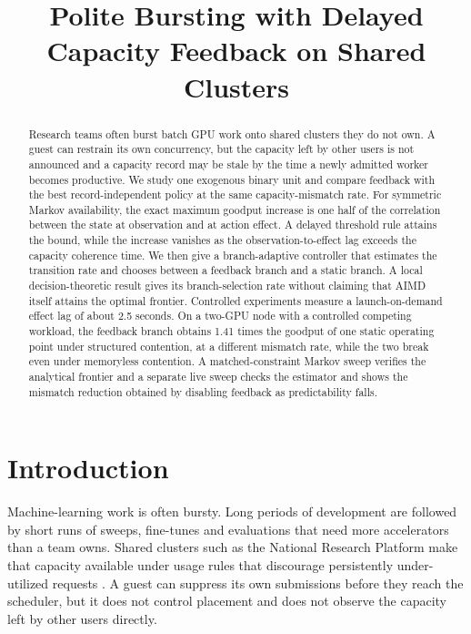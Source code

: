 \documentclass[10pt,conference,letterpaper]{IEEEtran}
\newif\ifblind
\begin{document}
\title{Polite Bursting with Delayed Capacity Feedback on Shared Clusters}

\ifblind
\author{}
\else
\author{
}
\fi

\maketitle

\begin{abstract}
Research teams often burst batch GPU work onto shared clusters they do not own.
A guest can restrain its own concurrency, but the capacity left by other users is
not announced and a capacity record may be stale by the time a newly admitted
worker becomes productive. We study one exogenous binary unit and compare
feedback with the best record-independent policy at the same capacity-mismatch
rate. For symmetric Markov availability, the exact maximum goodput increase is
one half of the correlation between the state at observation and at action
effect. A delayed threshold rule attains the bound, while the increase vanishes
as the observation-to-effect lag exceeds the capacity coherence time. We then
give a branch-adaptive controller that estimates the transition rate and chooses
between a feedback branch and a static branch. A local decision-theoretic result
gives its branch-selection rate without claiming that AIMD itself attains the
optimal frontier. Controlled experiments measure a launch-on-demand effect lag
of about 2.5 seconds. On a two-GPU node with a controlled competing workload,
the feedback branch obtains 1.41 times the goodput of one static operating point
under structured contention, at a different mismatch rate, while the two break
even under memoryless contention. A matched-constraint Markov sweep verifies the
analytical frontier and a separate live sweep checks the estimator and shows the
mismatch reduction obtained by disabling feedback as predictability falls.
\end{abstract}

\section{Introduction}
\label{sec:intro}
Machine-learning work is often bursty. Long periods of development are followed
by short runs of sweeps, fine-tunes and evaluations that need more accelerators
than a team owns. Shared clusters such as the National Research Platform
\cite{nautilus} make that capacity available under usage rules that discourage
persistently under-utilized requests \cite{nrppolicy}. A guest can suppress its
own submissions before they reach the scheduler, but it does not control
placement and does not observe the capacity left by other users directly.
\end{document}
